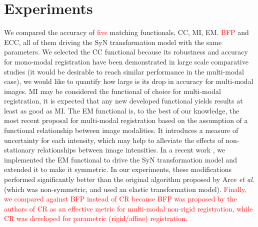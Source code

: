 \section{Experiments}
We compared the accuracy of \textcolor{red}{five} matching functionals, CC, MI, EM\textcolor{red}{, BFP} and ECC, all of them driving the SyN transformation model with the same parameters. We selected the CC functional because its robustness and accuracy for mono-modal registration have been demonstrated in large scale comparative studies \cite{Klein2009, Klein2010, Rohlfing2012} (it would be desirable to reach similar performance in the multi-modal case), we would like to quantify how large is its drop in accuracy for multi-modal images. MI \cite{Maes1997, Mattes2003} may be considered the functional of choice for multi-modal registration, it is expected that any new developed functional yields results at least as good as MI. The EM functional \cite{Arce-santana2014} is, to the best of our knowledge, the most recent proposal for multi-modal registration based on the assumption of a functional relationship between image modalities. It introduces a measure of uncertainty for each intensity, which may help to alleviate the effects of non-stationary relationships between image intensities. In a recent work \cite{Ocegueda2015}, we implemented the EM functional to drive the SyN transformation model and extended it to make it symmetric. In our experiments, these modifications performed significantly better than the original algorithm proposed by Arce {\it et al.} \cite{Arce-santana2014} (which was non-symmetric, and used an elastic transformation model). \textcolor{red}{Finally, we compared against BFP \cite{Guimond2001} instead of CR because BFP was proposed by the authors of CR as an effective metric for multi-modal non-rigid registration, while CR was developed for parametric (rigid/affine) registration.}


